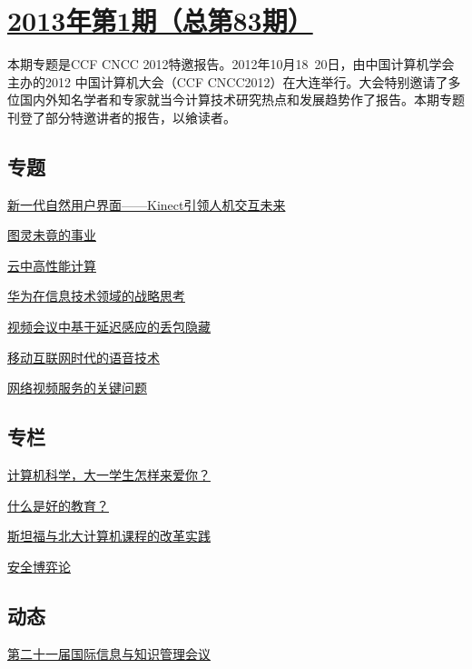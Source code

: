 \documentclass[a4paper]{article}
\begin{document}
\section{\href{http://history.ccf.org.cn/sites/ccf/jsjtbbd.jsp?contentId=2716908557315}{\textbf{2013年第1期（总第83期）}}}
本期专题是CCF CNCC 2012特邀报告。2012年10月18~20日，由中国计算机学会主办的2012
中国计算机大会（CCF CNCC2012）在大连举行。大会特别邀请了多位国内外知名学者和专家就当今计算技术研究热点和发展趋势作了报告。本期专题刊登了部分特邀讲者的报告，以飨读者。
\subsection{专题}
\href{http://history.ccf.org.cn/resources/1190201776262/2013/01/18/6.pdf}{新一代自然用户界面——Kinect引领人机交互未来}

\href{http://history.ccf.org.cn/resources/1190201776262/2013/01/18/1.pdf}{图灵未竟的事业}

\href{http://history.ccf.org.cn/resources/1190201776262/2013/01/18/2.pdf}{云中高性能计算}

\href{http://history.ccf.org.cn/resources/1190201776262/2013/01/18/7.pdf}{华为在信息技术领域的战略思考}

\href{http://history.ccf.org.cn/resources/1190201776262/2013/01/18/3.pdf}{视频会议中基于延迟感应的丢包隐藏}

\href{http://history.ccf.org.cn/resources/1190201776262/2013/01/18/5.pdf}{移动互联网时代的语音技术}

\href{http://history.ccf.org.cn/resources/1190201776262/2013/01/18/4.pdf}{网络视频服务的关键问题}

\subsection{专栏}
\href{http://history.ccf.org.cn/resources/1190201776262/2013/01/21/10.pdf}{计算机科学，大一学生怎样来爱你？}

\href{http://history.ccf.org.cn/resources/1190201776262/2013/01/18/9.pdf}{什么是好的教育？}

\href{http://history.ccf.org.cn/resources/1190201776262/2013/01/18/8.pdf}{斯坦福与北大计算机课程的改革实践}

\href{http://history.ccf.org.cn/resources/1190201776262/2013/01/21/11.pdf}{安全博弈论}

\subsection{动态}
\href{http://history.ccf.org.cn/resources/1190201776262/2013/01/21/12.pdf}{第二十一届国际信息与知识管理会议}
\end{document}
